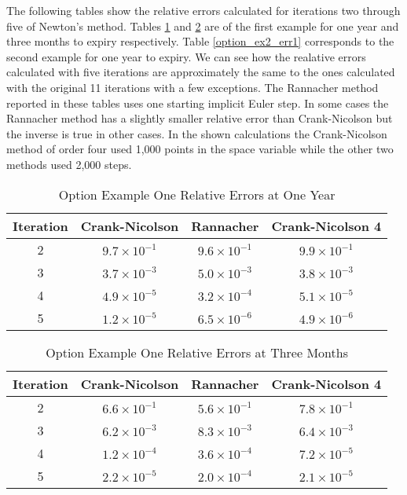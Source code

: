 \documentclass[00main.tex]{subfiles}
\begin{document}
The following tables show the relative errors calculated for iterations two through five of Newton's method. Tables \ref{option_ex1_err1} and \ref{option_ex1_err3} are of the first example for one year and three months to expiry respectively. Table \ref{option_ex2_err1} corresponds to the second example for one year to expiry. We can see how the realative errors calculated with five iterations are approximately the same to the ones calculated with the original 11 iterations with a few exceptions. The Rannacher method reported in these tables uses one starting implicit Euler step. In some cases the Rannacher method has a slightly smaller relative error than Crank-Nicolson but the inverse is true in other cases. In the shown calculations the Crank-Nicolson method of order four used 1,000 points in the space variable while the other two methods used 2,000 steps.

\begin{table}
  \centering
  \small
    \begin{tabular}{c|ccc}
    Iteration & Crank-Nicolson & Rannacher & Crank-Nicolson 4 \\ \hline
     2 & $9.7\times 10^{-1}$ & $9.6\times 10^{-1}$ & $9.9\times 10^{-1}$\\
     3 & $3.7\times 10^{-3}$ & $5.0 \times 10^{-3}$ & $3.8\times 10^{-3}$ \\
     4 & $4.9\times 10^{-5}$ & $3.2\times 10^{-4}$ & $5.1\times 10^{-5}$\\
     5 & $1.2\times 10^{-5}$ & $6.5\times 10^{-6}$ & $4.9\times 10^{-6}$ 
    \end{tabular}%
    \caption{Option Example One Relative Errors at One Year}
  \label{option_ex1_err1}%
\end{table}%


\begin{table}
  \centering
  \small
    \begin{tabular}{c|ccc}
    Iteration & Crank-Nicolson & Rannacher & Crank-Nicolson 4 \\ \hline
     2 & $6.6\times 10^{-1}$ & $5.6\times 10^{-1}$ & $7.8\times 10^{-1}$\\
     3 & $6.2\times 10^{-3}$ & $8.3 \times 10^{-3}$ & $6.4\times 10^{-3}$ \\
     4 & $1.2\times 10^{-4}$ & $3.6\times 10^{-4}$ & $7.2\times 10^{-5}$\\
     5 & $2.2\times 10^{-5}$ & $2.0\times 10^{-4}$ & $2.1\times 10^{-5}$ 
    \end{tabular}%
    \caption{Option Example One Relative Errors at Three Months}
  \label{option_ex1_err3}%
\end{table}%
\end{document}

